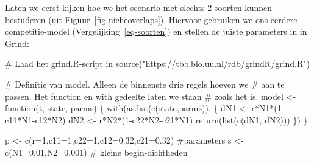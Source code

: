 \documentclass[
  a4paper,
]{scrbook}
\newenvironment{Shaded}{\begin{snugshade}}{\end{snugshade}}
\newcommand{\AttributeTok}[1]{\textcolor[rgb]{0.40,0.45,0.13}{#1}}
\newcommand{\CommentTok}[1]{\textcolor[rgb]{0.37,0.37,0.37}{#1}}
\newcommand{\ControlFlowTok}[1]{\textcolor[rgb]{0.00,0.23,0.31}{#1}}
\newcommand{\DecValTok}[1]{\textcolor[rgb]{0.68,0.00,0.00}{#1}}
\newcommand{\FloatTok}[1]{\textcolor[rgb]{0.68,0.00,0.00}{#1}}
\newcommand{\FunctionTok}[1]{\textcolor[rgb]{0.28,0.35,0.67}{#1}}
\newcommand{\NormalTok}[1]{\textcolor[rgb]{0.00,0.23,0.31}{#1}}
\newcommand{\OtherTok}[1]{\textcolor[rgb]{0.00,0.23,0.31}{#1}}
\newcommand{\SpecialCharTok}[1]{\textcolor[rgb]{0.37,0.37,0.37}{#1}}
\newcommand{\StringTok}[1]{\textcolor[rgb]{0.13,0.47,0.30}{#1}}
\theoremstyle{definition}
\theoremstyle{remark}
\begin{document}
Laten we eerst kijken hoe we het scenario met slechts 2 soorten kunnen
bestuderen (uit Figuur~\ref{fig-nicheoverlaps}). Hiervoor gebruiken we
ons eerdere competitie-model (Vergelijking~\ref{eq-soorten}) en stellen
de juiste parameters in in Grind:

\begin{Shaded}
\begin{Highlighting}[]
\CommentTok{\# Laad het grind.R{-}script in}
\FunctionTok{source}\NormalTok{(}\StringTok{"https://tbb.bio.uu.nl/rdb/grindR/grind.R"}\NormalTok{)}

\CommentTok{\# Definitie van model. Alleen de binnenste drie regels hoeven we }
\CommentTok{\# aan te passen. Het \textquotesingle{}function\textquotesingle{} en \textquotesingle{}with\textquotesingle{} gedeelte laten we staan}
\CommentTok{\# zoals het is. }
\NormalTok{model }\OtherTok{\textless{}{-}} \ControlFlowTok{function}\NormalTok{(t, state, parms) \{}
  \FunctionTok{with}\NormalTok{(}\FunctionTok{as.list}\NormalTok{(}\FunctionTok{c}\NormalTok{(state,parms)), \{}
\NormalTok{    dN1 }\OtherTok{\textless{}{-}}\NormalTok{ r}\SpecialCharTok{*}\NormalTok{N1}\SpecialCharTok{*}\NormalTok{(}\DecValTok{1}\SpecialCharTok{{-}}\NormalTok{c11}\SpecialCharTok{*}\NormalTok{N1}\SpecialCharTok{{-}}\NormalTok{c12}\SpecialCharTok{*}\NormalTok{N2)}
\NormalTok{    dN2 }\OtherTok{\textless{}{-}}\NormalTok{ r}\SpecialCharTok{*}\NormalTok{N2}\SpecialCharTok{*}\NormalTok{(}\DecValTok{1}\SpecialCharTok{{-}}\NormalTok{c22}\SpecialCharTok{*}\NormalTok{N2}\SpecialCharTok{{-}}\NormalTok{c21}\SpecialCharTok{*}\NormalTok{N1)}
    \FunctionTok{return}\NormalTok{(}\FunctionTok{list}\NormalTok{(}\FunctionTok{c}\NormalTok{(dN1, dN2)))  }
\NormalTok{  \}) }
\NormalTok{\}  }


\NormalTok{p }\OtherTok{\textless{}{-}} \FunctionTok{c}\NormalTok{(}\AttributeTok{r=}\DecValTok{1}\NormalTok{,}\AttributeTok{c11=}\DecValTok{1}\NormalTok{,}\AttributeTok{c22=}\DecValTok{1}\NormalTok{,}\AttributeTok{c12=}\FloatTok{0.32}\NormalTok{,}\AttributeTok{c21=}\FloatTok{0.32}\NormalTok{)  }\CommentTok{\#parameters}
\NormalTok{s }\OtherTok{\textless{}{-}} \FunctionTok{c}\NormalTok{(}\AttributeTok{N1=}\FloatTok{0.01}\NormalTok{,}\AttributeTok{N2=}\FloatTok{0.001}\NormalTok{) }\CommentTok{\# kleine begin{-}dichtheden}


\end{Highlighting}
\end{Shaded}
\end{document}
